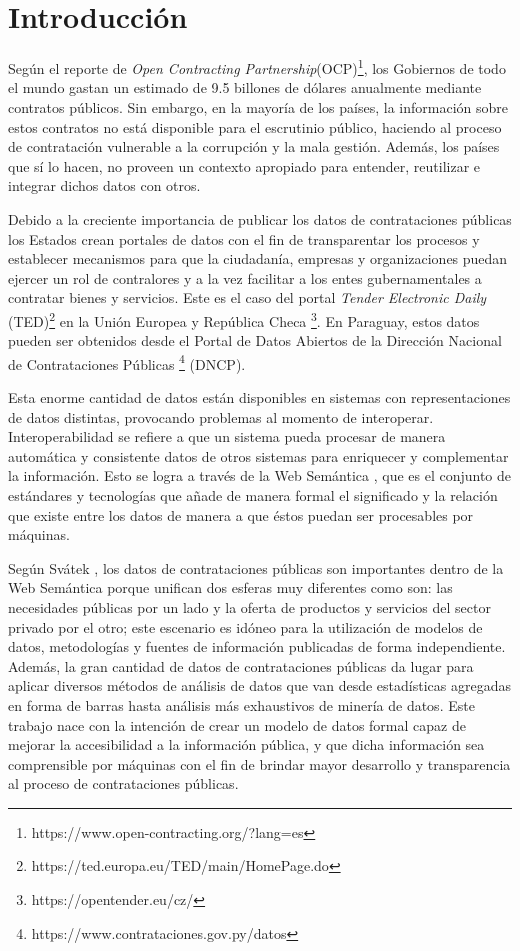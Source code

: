 \chapter{Introducción}
\label{chap:introduccion}




Según el reporte de \textit{Open Contracting Partnership}(OCP)\footnote{https://www.open-contracting.org/?lang=es}, los Gobiernos de todo el mundo gastan un estimado de 9.5 billones de dólares anualmente mediante contratos públicos. Sin embargo, en la mayoría de los países, la información sobre estos contratos no está disponible para el escrutinio público, haciendo al proceso de contratación vulnerable a la corrupción y la mala gestión. Además, los países que sí lo hacen, no proveen un contexto apropiado para entender, reutilizar e integrar dichos datos con otros.

Debido a la creciente importancia de publicar los datos de contrataciones públicas los Estados crean portales de datos con el fin de transparentar los procesos y establecer mecanismos para que la ciudadanía, empresas y organizaciones puedan ejercer un rol de contralores y a la vez facilitar a los entes gubernamentales a contratar bienes y servicios. Este es el caso del portal \textit{Tender Electronic Daily} (TED)\footnote{https://ted.europa.eu/TED/main/HomePage.do}  en la Unión Europea y República Checa \footnote{https://opentender.eu/cz/}. En Paraguay, estos datos pueden ser obtenidos desde el Portal de Datos Abiertos de la Dirección Nacional de Contrataciones Públicas \footnote{https://www.contrataciones.gov.py/datos} (DNCP).

Esta enorme cantidad de datos están disponibles en sistemas con representaciones de datos distintas, provocando problemas al momento de interoperar. Interoperabilidad se refiere a que un sistema pueda procesar de manera automática y consistente datos de otros sistemas para enriquecer y complementar la información. Esto se logra a través de la Web Semántica \cite{Semantic20:online}, que es el conjunto de estándares y tecnologías que añade de manera formal el significado y la relación que existe entre los datos de manera a que éstos puedan ser procesables por máquinas.

Según Svátek \cite{svatek2014linked}, los datos de contrataciones públicas son importantes dentro de la Web Semántica \cite{Semantic20:online} porque unifican dos esferas muy diferentes como son: las necesidades públicas por un lado y la oferta de productos y servicios del sector privado por el otro; este escenario es idóneo para la utilización de modelos de datos, metodologías y fuentes de información publicadas de forma independiente. Además, la gran cantidad de datos de contrataciones públicas da lugar para aplicar diversos métodos de análisis de datos que van desde estadísticas agregadas en forma de barras hasta análisis más exhaustivos de minería de datos.
Este trabajo nace con la intención de crear un modelo de datos formal capaz de mejorar la accesibilidad a la información pública, y que dicha información sea comprensible por máquinas con el fin de brindar mayor desarrollo y transparencia al proceso de contrataciones públicas. 


